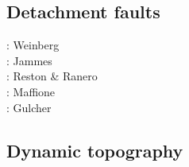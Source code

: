 \subsection{Detachment faults} 

\begin{scriptsize}
\twothousandseven: Weinberg \etal \cite{werr07}\\
\twothousandten: Jammes \etal \cite{jaml10}\\
\twothousandeleven: Reston \& Ranero \cite{rera11}\\
\twothousandfifteen: Maffione \etal \cite{matv15}\\
\twothousandnineteen: Gulcher \etal \cite{gubg19}
\end{scriptsize}

\subsection{Dynamic topography} 

